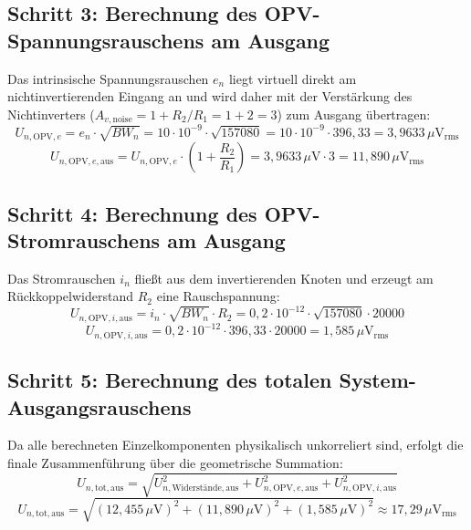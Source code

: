 \documentclass[11pt,a4paper]{article}
\begin{document}
\subsection{Schritt 3: Berechnung des OPV-Spannungsrauschens am Ausgang}
Das intrinsische Spannungsrauschen $e_n$ liegt virtuell direkt am nichtinvertierenden Eingang an und wird daher mit der Verstärkung des Nichtinverters ($A_{v,\text{noise}} = 1 + R_2/R_1 = 1 + 2 = 3$) zum Ausgang übertragen:
\begin{equation}
U_{n,\text{OPV},e} = e_n \cdot \sqrt{BW_n} = 10 \cdot 10^{-9} \cdot \sqrt{157080} = 10 \cdot 10^{-9} \cdot 396{,}33 = 3{,}9633\,\mu\text{V}_{\text{rms}}
\end{equation}
\begin{equation}
U_{n,\text{OPV},e,\text{aus}} = U_{n,\text{OPV},e} \cdot \left( 1 + \frac{R_2}{R_1} \right) = 3{,}9633\,\mu\text{V} \cdot 3 = 11{,}890\,\mu\text{V}_{\text{rms}}
\end{equation}

\subsection{Schritt 4: Berechnung des OPV-Stromrauschens am Ausgang}
Das Stromrauschen $i_n$ fließt aus dem invertierenden Knoten und erzeugt am Rückkoppelwiderstand $R_2$ eine Rauschspannung:
\begin{equation}
U_{n,\text{OPV},i,\text{aus}} = i_n \cdot \sqrt{BW_n} \cdot R_2 = 0{,}2 \cdot 10^{-12} \cdot \sqrt{157080} \cdot 20000
\end{equation}
\begin{equation}
U_{n,\text{OPV},i,\text{aus}} = 0{,}2 \cdot 10^{-12} \cdot 396{,}33 \cdot 20000 = 1{,}585\,\mu\text{V}_{\text{rms}}
\end{equation}

\subsection{Schritt 5: Berechnung des totalen System-Ausgangsrauschens}
Da alle berechneten Einzelkomponenten physikalisch unkorreliert sind, erfolgt die finale Zusammenführung über die geometrische Summation:
\begin{equation}
U_{n,\text{tot},\text{aus}} = \sqrt{U_{n,\text{Widerstände},\text{aus}}^2 + U_{n,\text{OPV},e,\text{aus}}^2 + U_{n,\text{OPV},i,\text{aus}}^2}
\end{equation}
\begin{equation}
U_{n,\text{tot},\text{aus}} = \sqrt{(12{,}455\,\mu\text{V})^2 + (11{,}890\,\mu\text{V})^2 + (1{,}585\,\mu\text{V})^2} \approx 17{,}29\,\mu\text{V}_{\text{rms}}
\end{equation}
\end{document}
